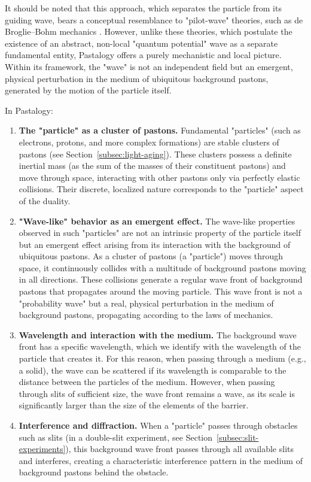 \documentclass[pdflatex,sn-mathphys-num,referee]{sn-jnl}
\begin{document}
It should be noted that this approach, which separates the particle from its guiding wave, bears a conceptual resemblance to "pilot-wave" theories, such as de Broglie--Bohm mechanics \cite{bohm1952-interpretation}. However, unlike these theories, which postulate the existence of an abstract, non-local "quantum potential" wave as a separate fundamental entity, Pastalogy offers a purely mechanistic and local picture. Within its framework, the "wave" is not an independent field but an emergent, physical perturbation in the medium of ubiquitous background pastons, generated by the motion of the particle itself.

In Pastalogy:
\begin{enumerate}
    \item \textbf{The "particle" as a cluster of pastons.} Fundamental "particles" (such as electrons, protons, and more complex formations) are stable clusters of pastons (see Section~\ref{subsec:light-aging}). These clusters possess a definite inertial mass (as the sum of the masses of their constituent pastons) and move through space, interacting with other pastons only via perfectly elastic collisions. Their discrete, localized nature corresponds to the "particle" aspect of the duality.
    \item \textbf{"Wave-like" behavior as an emergent effect.} The wave-like properties observed in such "particles" are not an intrinsic property of the particle itself but an emergent effect arising from its interaction with the background of ubiquitous pastons. As a cluster of pastons (a "particle") moves through space, it continuously collides with a multitude of background pastons moving in all directions. These collisions generate a regular wave front of background pastons that propagates around the moving particle. This wave front is not a "probability wave" but a real, physical perturbation in the medium of background pastons, propagating according to the laws of mechanics.
    \item \textbf{Wavelength and interaction with the medium.} The background wave front has a specific wavelength, which we identify with the wavelength of the particle that creates it. For this reason, when passing through a medium (e.g., a solid), the wave can be scattered if its wavelength is comparable to the distance between the particles of the medium. However, when passing through slits of sufficient size, the wave front remains a wave, as its scale is significantly larger than the size of the elements of the barrier.
    \item \textbf{Interference and diffraction.} When a "particle" passes through obstacles such as slits (in a double-slit experiment, see Section~\ref{subsec:slit-experiments}), this background wave front passes through all available slits and interferes, creating a characteristic interference pattern in the medium of background pastons behind the obstacle.

\end{enumerate}
\end{document}
